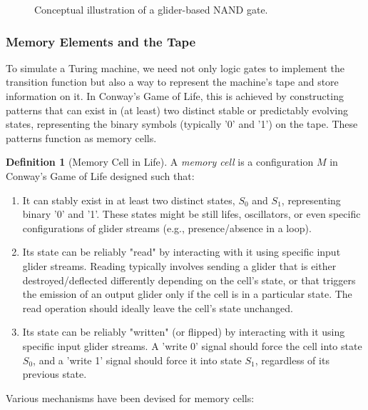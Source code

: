 \documentclass{article}
\theoremstyle{definition}
\newtheorem{definition}{Definition}[section]
\theoremstyle{plain}
\theoremstyle{plain}
\begin{document}
\begin{figure}[H]
  \centering
  \caption{Conceptual illustration of a glider-based NAND gate.}
  \label{fig:nand-gate}
\end{figure}

\subsubsection{Memory Elements and the Tape}

To simulate a Turing machine, we need not only logic gates to implement the transition function but also a way to represent the machine's tape and store information on it. In Conway's Game of Life, this is achieved by constructing patterns that can exist in (at least) two distinct stable or predictably evolving states, representing the binary symbols (typically '0' and '1') on the tape. These patterns function as memory cells.

\begin{definition}[Memory Cell in Life]
A \textit{memory cell} is a configuration $M$ in Conway's Game of Life designed such that:
\begin{enumerate}
  \item It can stably exist in at least two distinct states, $S_0$ and $S_1$, representing binary '0' and '1'. These states might be still lifes, oscillators, or even specific configurations of glider streams (e.g., presence/absence in a loop).
  \item Its state can be reliably "read" by interacting with it using specific input glider streams. Reading typically involves sending a glider that is either destroyed/deflected differently depending on the cell's state, or that triggers the emission of an output glider only if the cell is in a particular state. The read operation should ideally leave the cell's state unchanged.
  \item Its state can be reliably "written" (or flipped) by interacting with it using specific input glider streams. A 'write 0' signal should force the cell into state $S_0$, and a 'write 1' signal should force it into state $S_1$, regardless of its previous state.
\end{enumerate}
\end{definition}

Various mechanisms have been devised for memory cells:
\end{document}
